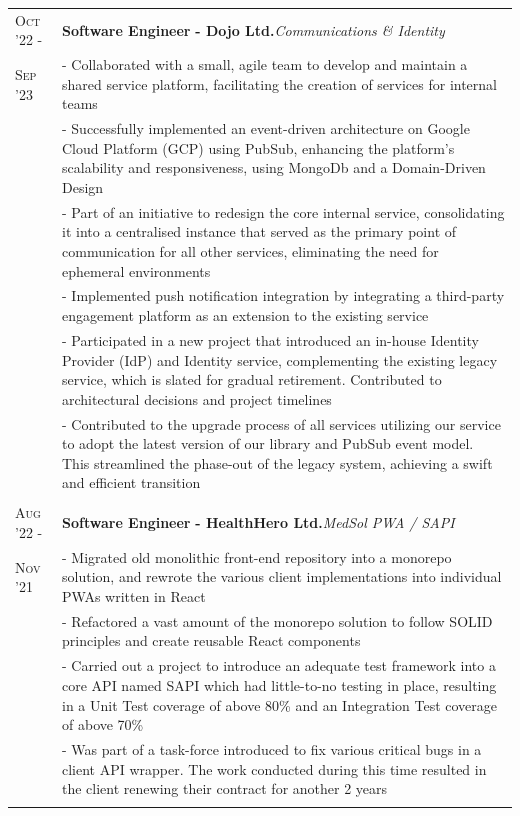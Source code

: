 \documentclass[a4paper,10pt]{extarticle} %
\begin{document}
{\begin{tabularx}{\linewidth}{ l | X }
\textsc{Oct '22 -} & \textbf{Software Engineer} \textbf{ - Dojo Ltd.}\hfill\textit{Communications \& Identity}\\
\textsc{Sep '23} & {- Collaborated with a small, agile team to develop and maintain a shared service platform, facilitating the creation of services for internal teams}\\
& {- Successfully implemented an event-driven architecture on Google Cloud Platform (GCP) using PubSub, enhancing the platform's scalability and responsiveness, using MongoDb and a Domain-Driven Design}\\
& {- Part of an initiative to redesign the core internal service, consolidating it into a centralised instance that served as the primary point of communication for all other services, eliminating the need for ephemeral environments}\\
& {- Implemented push notification integration by integrating a third-party engagement platform as an extension to the existing service}\\
& {- Participated in a new project that introduced an in-house Identity Provider (IdP) and Identity service, complementing the existing legacy service, which is slated for gradual retirement. Contributed to architectural decisions and project timelines}\\
& {- Contributed to the upgrade process of all services utilizing our service to adopt the latest version of our library and PubSub event model. This streamlined the phase-out of the legacy system, achieving a swift and efficient transition}\\
\multicolumn{1}{c}{} \\

\textsc{Aug '22 -} & \textbf{Software Engineer} \textbf{ - HealthHero Ltd.}\hfill\textit{MedSol PWA / SAPI}\\
\textsc{Nov '21}& {- Migrated old monolithic front-end repository into a monorepo solution, and rewrote the various client implementations into individual PWAs written in React}\\
& {- Refactored a vast amount of the monorepo solution to follow SOLID principles and create reusable React components}\\
& {- Carried out a project to introduce an adequate test framework into a core API named SAPI which had little-to-no testing in place, resulting in a Unit Test coverage of above 80\% and an Integration Test coverage of above 70\%}\\
& {- Was part of a task-force introduced to fix various critical bugs in a client API wrapper. The work conducted during this time resulted in the client renewing their contract for another 2 years}\\
\multicolumn{1}{c}{} \\


\end{tabularx}}
\end{document}
